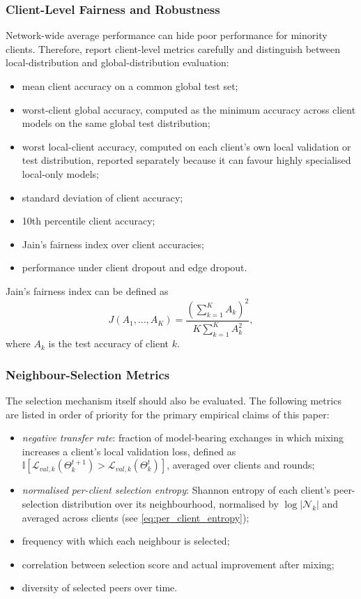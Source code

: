 \documentclass[conference]{IEEEtran}
\begin{document}
\subsubsection{Client-Level Fairness and Robustness}
\label{subsubsec:client-level-fairness-and-robustness}
Network-wide average performance can hide poor performance for minority clients. Therefore, report client-level metrics carefully and distinguish between local-distribution and global-distribution evaluation:
\begin{itemize}
    \item mean client accuracy on a common global test set;
    \item worst-client global accuracy, computed as the minimum accuracy across client models on the same global test distribution;
    \item worst local-client accuracy, computed on each client's own local validation or test distribution, reported separately because it can favour highly specialised local-only models;
    \item standard deviation of client accuracy;
    \item 10th percentile client accuracy;
    \item Jain's fairness index over client accuracies;
    \item performance under client dropout and edge dropout.
\end{itemize}

Jain's fairness index can be defined as
\begin{equation}
    J(A_1,\dots,A_K)
    =
    \frac{(\sum_{k=1}^{K}A_k)^2}{K\sum_{k=1}^{K}A_k^2},
    \label{eq:auto-101}
\end{equation}
where \(A_k\) is the test accuracy of client \(k\).

\subsubsection{Neighbour-Selection Metrics}
\label{subsubsec:neighbour-selection-metrics}
The selection mechanism itself should also be evaluated. The following metrics are listed in order of priority for the primary empirical claims of this paper:
\begin{itemize}
    \item \emph{negative transfer rate}: fraction of model-bearing exchanges in which mixing increases a client's local validation loss, defined as $\mathbb{I}[\mathcal{L}_{val,k}(\Theta_k^{t+1}) > \mathcal{L}_{val,k}(\Theta_k^t)]$, averaged over clients and rounds;
    \item \emph{normalised per-client selection entropy}: Shannon entropy of each client's peer-selection distribution over its neighbourhood, normalised by $\log|\mathcal{N}_k|$ and averaged across clients (see \eqref{eq:per_client_entropy});
    \item frequency with which each neighbour is selected;
    \item correlation between selection score and actual improvement after mixing;
    \item diversity of selected peers over time.
\end{itemize}
\end{document}
